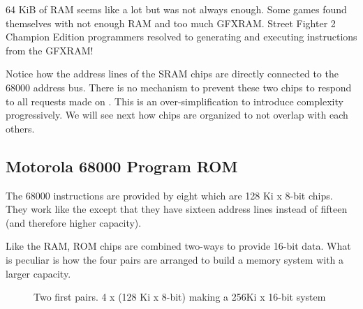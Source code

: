 
 \begin{trivia}
 64 KiB of RAM seems like a lot but was not always enough. Some games found themselves with not enough RAM and too much GFXRAM. Street Fighter 2 Champion Edition programmers resolved to generating and executing instructions from the GFXRAM\cite{mame_driver}!
 \end{trivia}

Notice how the address lines of the SRAM chips are directly connected to the 68000 address bus. There is no mechanism to prevent these two chips to respond to all requests made on \icode{[0x**0000-0x**7FFF]}. This is an over-simplification to introduce complexity progressively. We will see next how chips are organized to not overlap with each others.









\subsection{Motorola 68000 Program ROM}


The 68000 instructions are provided by eight  which are 128 Ki x 8-bit chips. They work like the  except that they have sixteen address lines instead of fifteen (and therefore higher capacity).

Like the RAM, ROM chips are combined two-ways to provide 16-bit data. What is peculiar is how the four pairs are arranged to build a memory system with a larger capacity.


\begin{figure}[H]
\caption*{Two first pairs. 4 x (128 Ki x 8-bit) making a 256Ki x 16-bit system}
\end{figure}

